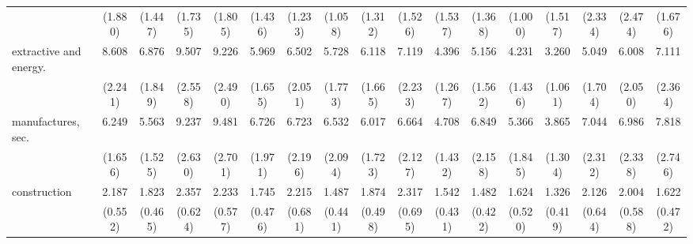 {\begin{tabular}{l*{16}{c}}
                    &     (1.880)         &     (1.447)         &     (1.735)         &     (1.805)         &     (1.436)         &     (1.233)         &     (1.058)         &     (1.312)         &     (1.526)         &     (1.537)         &     (1.368)         &     (1.000)         &     (1.517)         &     (2.334)         &     (2.474)         &     (1.676)         \\
[1em]
extractive and energy.&       8.608\sym{***}&       6.876\sym{***}&       9.507\sym{***}&       9.226\sym{***}&       5.969\sym{***}&       6.502\sym{***}&       5.728\sym{***}&       6.118\sym{***}&       7.119\sym{***}&       4.396\sym{***}&       5.156\sym{***}&       4.231\sym{***}&       3.260\sym{***}&       5.049\sym{***}&       6.008\sym{***}&       7.111\sym{***}\\
                    &     (2.241)         &     (1.849)         &     (2.558)         &     (2.490)         &     (1.655)         &     (2.051)         &     (1.773)         &     (1.665)         &     (2.233)         &     (1.267)         &     (1.562)         &     (1.436)         &     (1.061)         &     (1.704)         &     (2.050)         &     (2.364)         \\
[1em]
manufactures, sec.  &       6.249\sym{***}&       5.563\sym{***}&       9.237\sym{***}&       9.481\sym{***}&       6.726\sym{***}&       6.723\sym{***}&       6.532\sym{***}&       6.017\sym{***}&       6.664\sym{***}&       4.708\sym{***}&       6.849\sym{***}&       5.366\sym{***}&       3.865\sym{***}&       7.044\sym{***}&       6.986\sym{***}&       7.818\sym{***}\\
                    &     (1.656)         &     (1.525)         &     (2.630)         &     (2.701)         &     (1.971)         &     (2.196)         &     (2.094)         &     (1.723)         &     (2.127)         &     (1.432)         &     (2.158)         &     (1.845)         &     (1.304)         &     (2.312)         &     (2.338)         &     (2.746)         \\
[1em]
construction        &       2.187\sym{**} &       1.823\sym{*}  &       2.357\sym{**} &       2.233\sym{**} &       1.745\sym{*}  &       2.215\sym{**} &       1.487         &       1.874\sym{*}  &       2.317\sym{**} &       1.542         &       1.482         &       1.624         &       1.326         &       2.126\sym{*}  &       2.004\sym{*}  &       1.622         \\
                    &     (0.552)         &     (0.465)         &     (0.624)         &     (0.577)         &     (0.476)         &     (0.681)         &     (0.441)         &     (0.498)         &     (0.695)         &     (0.431)         &     (0.422)         &     (0.520)         &     (0.419)         &     (0.644)         &     (0.588)         &     (0.472)         \\

\end{tabular}}
